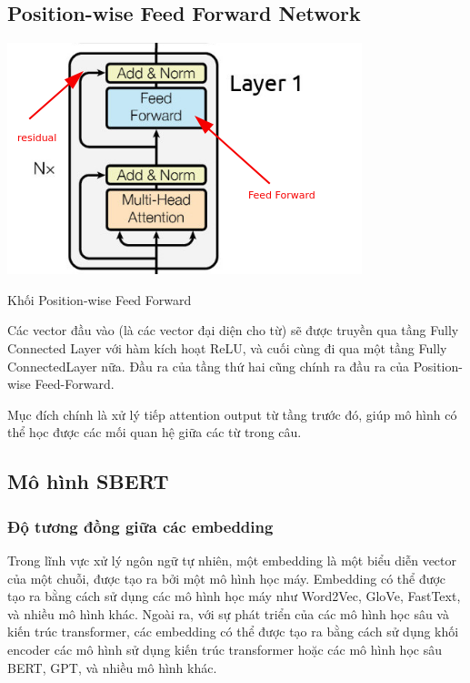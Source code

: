\documentclass[a4paper, 12pt, openany]{book}
\begin{document}
\subsection{Position-wise Feed Forward Network}
\begin{minipage}{\linewidth}
    \captionsetup{type=figure}
    \centering
    \includegraphics[width=.6\linewidth]{./assets/images/feed-forward-sublayer-in-transformer.png}
    \caption{Khối Position-wise Feed Forward\cite{341553895_Natural_language_processing_system_for_self-reflection_and_peer-evaluation}}
\end{minipage}

Các vector đầu vào (là các vector đại diện cho từ) sẽ được truyền qua tầng Fully Connected Layer với hàm kích hoạt ReLU, và cuối cùng đi qua một tầng Fully ConnectedLayer nữa.
Đầu ra của tầng thứ hai cũng chính ra đầu ra của Position-wise Feed-Forward.

Mục đích chính là xử lý tiếp attention output từ tầng trước đó, giúp mô hình có thể học được các mối quan hệ giữa các từ trong câu.



\subsection{Mô hình SBERT} 
\subsubsection{Độ tương đồng giữa các embedding}

Trong lĩnh vực xử lý ngôn ngữ tự nhiên, một embedding là một biểu diễn vector của một chuỗi, được tạo ra bởi một mô hình học máy. Embedding có thể được tạo ra bằng cách sử dụng các mô hình học máy như Word2Vec, GloVe, FastText, và nhiều mô hình khác.
Ngoài ra, với sự phát triển của các mô hình học sâu và kiến trúc transformer, các embedding có thể được tạo ra bằng cách sử dụng khối encoder các mô hình sử dụng kiến trúc transformer hoặc các mô hình học sâu BERT, GPT, và nhiều mô hình khác.
\end{document}

